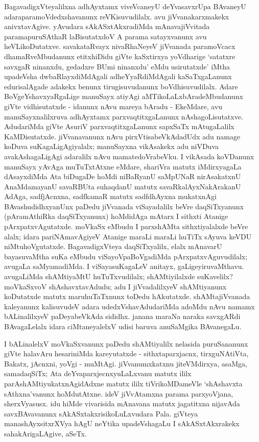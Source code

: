 BagavadigxVteyalilxna adhAyxtamx viveVcaneyU deYvasavxrUpa BAvaneyU adara\break paramoVdedxshavanunx reVKisuvudilalx. avu jiVvanakarxmakekx anivxtavAgive. yAvudara sAkASxtAkxradiMda mAnavajiVvitada paramapuruSAthaR laBisutatxdoV A parama satayxvanunx avu heVLikoDutatxve. savakataRvayx nivaRhaNeyeV jiVvanada paramoVcacx dhamaRveMbudanunx etitxhiDidu giVte kaSxtirxya yoVdharige `satatxre savxgaR ninanxdu, gedadxre BUmi ninanxdu' eMdu usirutatxde' iMtha upadeVsha dwbaRlayxdiMdAgali adheYyaR\-diMdAgali kaSaTxgaLanunx edurisalAgade adakekx benunx tirugisuvudanunx boVdhisuvudilalx. Adare BoVgeYshavxyaRgaLige manuSayx atiyAgi aMTikoLaLxbAradeMbudanunx giVte vidhisutatxde - idanunx nAvu mareya bAradu - EkeMdare, avu manuSayxnalilxruva adhAyxtamx parxvaqtitxgaLanunx nAshagoLisutatxve. AdudariMda giVte AsuriV parxvaqtitxgaLanunx sapxSaTx mAtugaLalilx KaMDisutatxde. jiVvanavanunx nAvu pirxVtisabeVkAdadUdx adu namage koDuva suKagaLigAgiyalalx; manuSayxna vikAsakekx adu niVDuva avakAshagaLigAgi adaralilx nAvu mamatedoVrabeVku. I vikAsada koVDanunx manuSayx yAvAga muTuTxtAtxne eMdare, shariVra matutx iMdirxyagaLa dAsayxdiMda Ata biDugaDe hoMdi niBaRyanU saMpUNaR nirAsakatxnU AnaMdamayanU savaRBUta suhaqdanU matutx savaRkalAyxNakArakanU AdAga, sadfjAcnxna, sadfkamaR matutx sadfdhAyxna mukatxnAgi BAvashudidhxyanUnx paDedu jiVvanada viSayadalilx beVre daqSiTxyanunx (pAramAthiRka daqSiTxyanunx) hoMdidAga mAtarx I sithxti Atanige pArxpatxvAgutatxde. moVkaSx eMbudu I parxshAMta sithxtiyalalxde beVre alalx; idara pariNAmavAgiyeV Atanige maraLi maraLi huTiTx sAyuva keVDU niMtuhoVgutatxde. BagavadigxVteya daqSiTxyalilx, elalx mAnavarU bayasuvaMtha suKa eMbudu viSayoVpaBoVgadiMda pArxpatxvAguvudilalx; avugaLa saMyamadiMda. I viSayasuKagaLeV anitayx, gaLigeyiruvaMthavu. avugaLiMda shAMtiyaMtU huTuTxvudilalx; shAMtiyilalxde suKavelilx? moVkaSxvoV shAshavxtavAdudu; adu I jiVvadalilxyeV shAMtiyanunx koDutatxde matutx maruhuTaTxnunx toDedu hAkutatxde. shAMtajiVvanada kaleyanunx kalisuvudeV adara udedxVshavAdudariMda adoMdu nAvu namamx bALinalilxyeV paDeyabeVkAda sididhx. janana maraNa naraka savxgARdi BAvagaLelalx idara ciMtaneyalelxV udisi baruva anuSaMgika BAvanegaLu.

I bALinalelxV moVkaSxvanunx paDedu shAMtiyalilx nelasida puruSananunx giVte halavAru hesariniMda kareyutatxde - sithxtaparxjacnx, tirxguNAtiVta, Bakatx, jAcnxni, yoVgi - muMtAgi. jiVvanumxkatxnu jiteVMdirxya, asaMga, samadaqSiTx; Ata deYvaparxjecnxyuLaLxvanu matutx ililx parAshAMtiyukatxnAgidAdxne matutx ililx tiVrikoMDameVle `shAshavxta sAthxna'vanunx hoMdutAtxne. ideV jiVvAtamxna parama parxyoVjana, sherxVyasusx. idu hiMde vivarisida mAnavana matutx jagatitxna nijavAda savxBAvavanunx sAkASxtakxrisikoLuLxvudara Pala. giVteya manashAyxsitxrXVya hAgU neYtika upadeVshagaLu I sAkASxtAkxrakekx sahakArigaLAgive, aSeTx.

